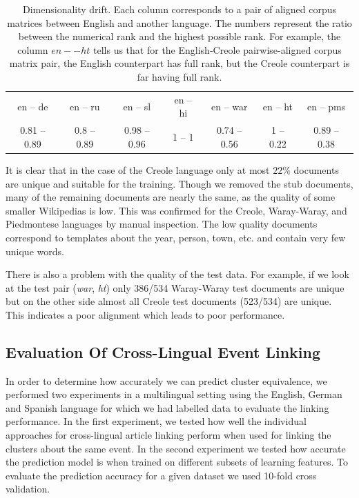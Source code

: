 \documentclass[twoside,11pt]{article}
\begin{document}
\begin{table}[h]
\caption{Dimensionality drift. Each column corresponds to a pair of aligned corpus matrices between English and another language. The numbers represent the ratio between the numerical rank and the highest possible rank. For example, the column $en -- ht$ tells us that for the English-Creole pairwise-aligned corpus matrix pair, the English counterpart has full rank, but the Creole counterpart is far having full rank.}
\label{table:rank}
\begin{tabular}{|c|c|c|c|c|c|c|}
\cline{1-7}
en -- de     &   en -- ru     &   en -- sl       &     en -- hi &   en -- war      &      en -- ht &   en -- pms\\
\cline{1-7}
0.81 -- 0.89   &  0.8 -- 0.89  &   0.98 -- 0.96    &    1 -- 1  &  0.74 -- 0.56  &      1 -- 0.22  &   0.89 -- 0.38\\
\cline{1-7}
\end{tabular}
\end{table}

It is clear that in the case of the Creole language only at most $22\%$ documents are unique and suitable for the training. Though we removed the stub documents, many of the remaining documents are nearly the same, as the quality of some smaller Wikipedias is low. This was confirmed for the Creole, Waray-Waray, and Piedmontese languages by manual inspection. The low quality documents correspond to templates about the year, person, town, etc. and contain very few unique words.

There is also a problem with the quality of the test data. For example, if we look at the test pair (\emph{war}, \emph{ht}) only 386/534 Waray-Waray test documents are unique but on the other side almost all Creole test documents (523/534) are unique. This indicates a poor alignment which leads to poor performance.

\subsection{Evaluation Of Cross-Lingual Event Linking}
In order to determine how accurately we can predict cluster equivalence, we performed two experiments in a multilingual setting using the English, German and Spanish language for which we had labelled data to evaluate the linking performance. In the first experiment, we tested how well  the individual approaches for cross-lingual article linking perform when used for linking the clusters about the same event. In the second experiment we tested how accurate the prediction model is when trained on different subsets of learning features. To evaluate the prediction accuracy for a given dataset we used 10-fold cross validation.
\end{document}
